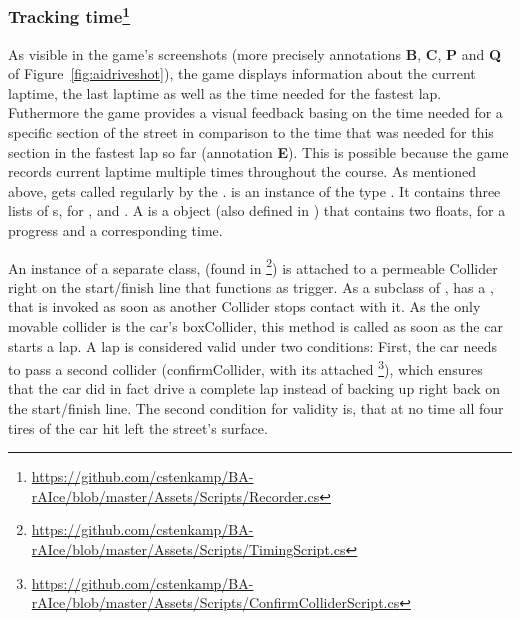 \subsubsection{Tracking time\footnote{\url{https://github.com/cstenkamp/BA-rAIce/blob/master/Assets/Scripts/Recorder.cs}}}

As visible in the game's screenshots (more precisely annotations \textbf{B}, \textbf{C}, \textbf{P} and \textbf{Q} of Figure~\ref{fig:aidriveshot}), the game displays information about the current laptime, the last laptime as well as the time needed for the fastest lap. Futhermore the game provides a visual feedback basing on the time needed for a specific section of the street in comparison to the time that was needed for this section in the fastest lap so far (annotation \textbf{E}). This is possible because the game records current laptime multiple times throughout the course. As mentioned above,  gets called regularly by the .  is an instance of the type . It contains three lists of s, for ,  and . A  is a  object (also defined in ) that contains two floats, for a progress and a corresponding time.

An instance of a separate class,  (found in \footnote{\url{https://github.com/cstenkamp/BA-rAIce/blob/master/Assets/Scripts/TimingScript.cs}}\byLeon) is attached to a permeable Collider right on the start/finish line that functions as trigger. As a subclass of ,  has a , that is invoked as soon as another Collider stops contact with it. As the only movable collider is the car's boxCollider, this method is called as soon as the car starts a lap. A lap is considered valid under two conditions: First, the car needs to pass a second collider (confirmCollider, with its attached \footnote{\url{https://github.com/cstenkamp/BA-rAIce/blob/master/Assets/Scripts/ConfirmColliderScript.cs}}\byLeon), which ensures that the car did in fact drive a complete lap instead of backing up right back on the start/finish line. The second condition for validity is, that at no time all four tires of the car hit left the street's surface.

